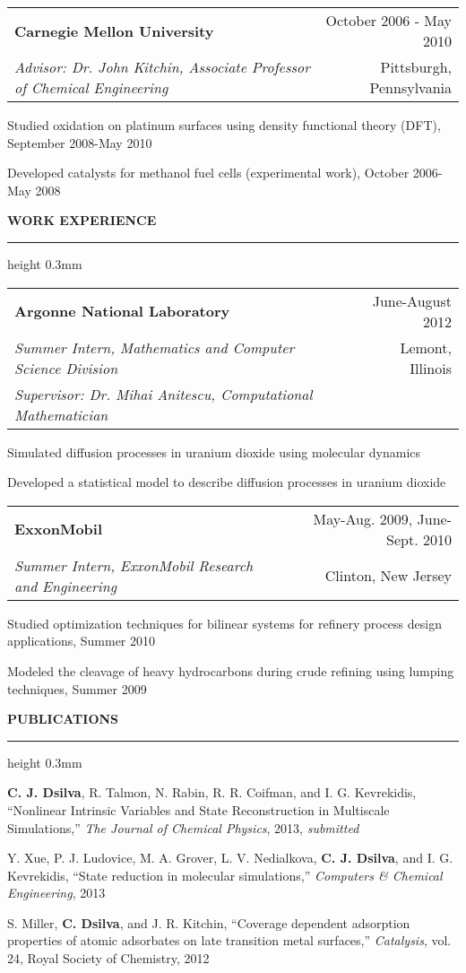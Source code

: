 \documentclass[letterpaper,10pt]{article}
\makeatletter
\newenvironment{itemize*}
  {\begin{itemize}
    \setlength{\parskip}{-2pt}}
  {\end{itemize}}
\newcommand{\cvheading}[1]{
\vspace{0.15in}
\noindent
\MakeUppercase{\bf #1}
\vspace{0.08in}
{\hrule height 0.3mm}
\vspace{0.08in}}
\newcommand{\workplace}[4]{
\noindent
\begin{tabular*}{1.0\textwidth}{@{\extracolsep{\fill}} l r}
{\bf #1} & #2\\
{\em #3} & #4\\
\end{tabular*}
\vspace{-0.15in}
}
\newcommand{\workplaceadvisor}[5]{
\noindent
\begin{tabular*}{1.0\textwidth}{@{\extracolsep{\fill}} l r}
{\bf #1} & #2\\
{\em #3} & #4\\
{\em #5} & \\
\end{tabular*}
\vspace{-0.15in}
}
\newcommand{\spacing}[0]{
\vspace{0.1in}
}
\makeatother
\begin{document}
\spacing

\workplace{Carnegie Mellon University}{October 2006 - May 2010}{Advisor: Dr. John Kitchin, Associate Professor of Chemical Engineering}{Pittsburgh, Pennsylvania}
\begin{itemize*}
\item Studied oxidation on platinum surfaces using density functional theory (DFT), September 2008-May 2010
\item Developed catalysts for methanol fuel cells (experimental work), October 2006-May 2008
\end{itemize*}


\cvheading{Work Experience}
\workplaceadvisor{Argonne National Laboratory}{June-August 2012}{Summer Intern, Mathematics and Computer Science Division}{Lemont, Illinois}{Supervisor: Dr. Mihai Anitescu, Computational Mathematician}
\begin{itemize*}
\item Simulated diffusion processes in uranium dioxide using molecular dynamics
\item Developed a statistical model to describe diffusion processes in uranium dioxide
\end{itemize*}

\spacing

\workplace{ExxonMobil}{May-Aug. 2009, June-Sept. 2010}{Summer Intern, ExxonMobil Research and Engineering}{Clinton, New Jersey}
\begin{itemize*}
\item Studied optimization techniques for bilinear systems for refinery process design applications, Summer 2010
\item Modeled the cleavage of heavy hydrocarbons during crude refining using lumping techniques, Summer 2009
\end{itemize*}

\newpage
\cvheading{Publications}
\begin{itemize*}
\item {\bf C. J. Dsilva}, R. Talmon, N. Rabin, R. R. Coifman, and I. G. Kevrekidis, ``Nonlinear Intrinsic Variables and State Reconstruction in Multiscale Simulations,''
{\em The Journal of Chemical Physics}, 2013, {\em submitted}
\item Y. Xue, P. J. Ludovice, M. A. Grover, L. V. Nedialkova, {\bf C. J. Dsilva}, and I. G. Kevrekidis, ``State reduction in molecular simulations,'' {\em Computers \& Chemical Engineering}, 2013
\item S. Miller, {\bf C. Dsilva}, and J. R. Kitchin, ``Coverage dependent adsorption properties of atomic adsorbates on late transition metal surfaces,'' {\em Catalysis}, vol. 24, Royal Society of Chemistry, 2012
\end{itemize*}
\end{document}
